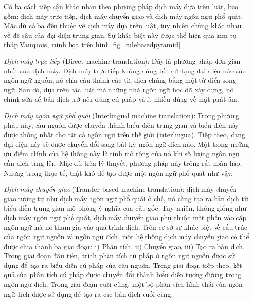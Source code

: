 Có ba cách tiếp cận khác nhau theo phương pháp dịch máy dựa trên luật, bao gồm: dịch máy trực tiếp, dịch máy chuyển giao và dịch máy ngôn ngữ phổ quát. Mặc dù cả ba đều thuộc về dịch máy dựa trên luật, tuy nhiên chúng khác nhau về độ sâu của đại diện trung gian. Sự khác biệt này được thể hiện qua kim tự tháp Vauquois, minh họa trên hình \ref{fig_rulebasedpyramid}.

\textit{Dịch máy trực tiếp} (Direct machine translation): Đây là phương pháp đơn giản nhất của dịch máy. Dịch máy trực tiếp không dùng bất cứ dạng đại diện nào của ngôn ngữ nguồn, nó chia câu thành các từ, dịch chúng bằng một từ điển song ngữ. Sau đó, dựa trên các luật mà những nhà ngôn ngữ học đã xây dựng, nó chỉnh sửa để bản dịch trở nên đúng cú pháp và ít nhiều đúng về mặt phát âm.

\textit{Dịch máy ngôn ngữ phổ quát} (Interlingual machine translation): Trong phương pháp này, câu nguồn được chuyển thành biểu diễn trung gian và biểu diễn này được thống nhất cho tất cả ngôn ngữ trên thế giới (interlingua). Tiếp theo, dạng đại diện này sẽ được chuyển đổi sang bất kỳ ngôn ngữ đích nào. Một trong những ưu điểm chính của hệ thống này là tính mở rộng của nó khi số lượng ngôn ngữ cần dịch tăng lên. Mặc dù trên lý thuyết, phương pháp này trông rất hoàn hảo. Nhưng trong thực tế, thật khó để tạo được một ngôn ngữ phổ quát như vậy.

\textit{Dịch máy chuyển giao} (Transfer-based machine translation): dịch máy chuyển giao tương tự như dịch máy ngôn ngữ phổ quát ở chỗ, nó cũng tạo ra bản dịch từ biểu diễn trung gian mô phỏng ý nghĩa của câu gốc. Tuy nhiên, không giống như dịch máy ngôn ngữ phổ quát, dịch máy chuyển giao phụ thuộc một phần vào cặp ngôn ngữ mà nó tham gia vào quá trình dịch. Trên cơ sở sự khác biệt về cấu trúc của ngôn ngữ nguồn và ngôn ngữ đích, một hệ thống dịch máy chuyển giao có thể được chia thành ba giai đoạn: i) Phân tích, ii) Chuyển giao, iii) Tạo ra bản dịch. Trong giai đoạn đầu tiên, trình phân tích cú pháp ở ngôn ngữ nguồn được sử dụng để tạo ra biểu diễn cú pháp của câu nguồn. Trong giai đoạn tiếp theo, kết quả của phân tích cú pháp được chuyển đổi thành biểu diễn tương đương trong ngôn ngữ đích. Trong giai đoạn cuối cùng, một bộ phân tích hình thái của ngôn ngữ đích được sử dụng để tạo ra các bản dịch cuối cùng.

